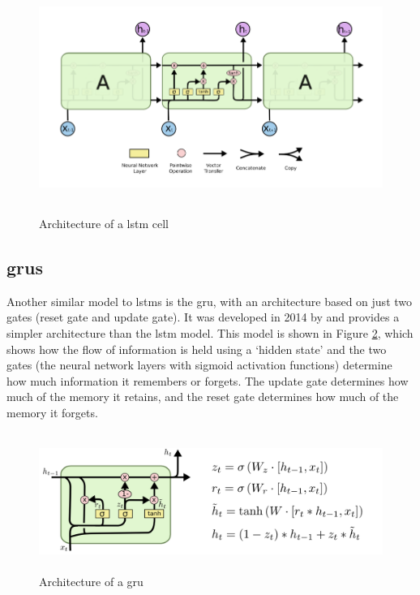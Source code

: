 \begin{figure}[h]
    \centering
    \includegraphics[height=7.5cm,trim={0 0 0 0cm},clip]{paper/images/lstm.png}
    \caption{Architecture of a \acrlong{lstm} cell \citep{olah2015understanding}}
    \label{fig:lstm_architecture}
\end{figure}

\subsection{\acrlong{gru}s}
\label{sec:background_grus}

Another similar model to \acrshort{lstm}s is the \acrfull {gru}, with an architecture based on just two gates (reset gate and update gate). It was developed in 2014 by \citet{cho2014learning} and provides a simpler architecture than the \acrshort{lstm} model. This model is shown in Figure \ref{fig:gru_architecture}, which shows how the flow of information is held using a `hidden state' and the two gates (the neural network layers with sigmoid activation functions) determine how much information it remembers or forgets. The update gate determines how much of the memory it retains, and the reset gate determines how much of the memory it forgets.

\begin{figure}[h]
    \centering
    \includegraphics[height=4.5cm,trim={0 0 12cm 0cm},clip]{paper/images/gru.png}
    \caption{Architecture of a \acrlong{gru} \citep{olah2015understanding}}
    \label{fig:gru_architecture}
\end{figure}

